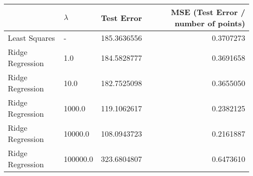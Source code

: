 \begin{tabular}{llrr}
\toprule
   & $\lambda$ & Test Error & MSE (Test Error / number of points) \\
\midrule
Least Squares & - & 185.3636556 & 0.3707273 \\
Ridge Regression & 1.0 & 184.5828777 & 0.3691658 \\
Ridge Regression & 10.0 & 182.7525098 & 0.3655050 \\
Ridge Regression & 1000.0 & 119.1062617 & 0.2382125 \\
Ridge Regression & 10000.0 & 108.0943723 & 0.2161887 \\
Ridge Regression & 100000.0 & 323.6804807 & 0.6473610 \\
\bottomrule
\end{tabular}
